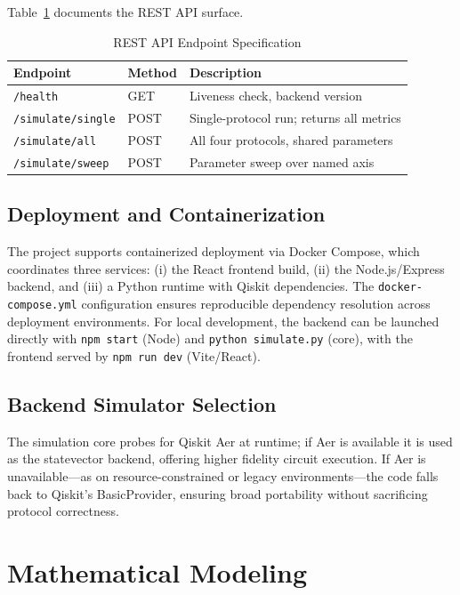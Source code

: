 \documentclass[journal]{IEEEtran}
\begin{document}
Table~\ref{tab:api} documents the REST API surface.

\begin{table}[!t]
  \caption{REST API Endpoint Specification}
  \label{tab:api}
  \centering
  \footnotesize
  \begin{tabular}{lll}
    \toprule
    Endpoint & Method & Description \\
    \midrule
    \texttt{/health}           & GET  & Liveness check, backend version \\
    \texttt{/simulate/single}  & POST & Single-protocol run; returns all metrics \\
    \texttt{/simulate/all}     & POST & All four protocols, shared parameters \\
    \texttt{/simulate/sweep}   & POST & Parameter sweep over named axis \\
    \bottomrule
  \end{tabular}
\end{table}

\subsection{Deployment and Containerization}

The project supports containerized deployment via Docker Compose, which
coordinates three services: (i) the React frontend build, (ii) the
Node.js/Express backend, and (iii) a Python runtime with Qiskit
dependencies. The \texttt{docker-compose.yml} configuration ensures
reproducible dependency resolution across deployment environments. For
local development, the backend can be launched directly with
\texttt{npm start} (Node) and \texttt{python simulate.py} (core),
with the frontend served by \texttt{npm run dev} (Vite/React).

\subsection{Backend Simulator Selection}

The simulation core probes for Qiskit Aer at runtime; if Aer is
available it is used as the statevector backend, offering higher
fidelity circuit execution. If Aer is unavailable—as on resource-constrained
or legacy environments—the code falls back to Qiskit's BasicProvider,
ensuring broad portability without sacrificing protocol correctness.

\section{Mathematical Modeling}
\label{sec:math}
\end{document}
